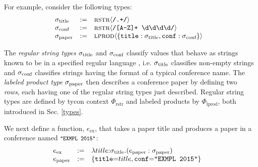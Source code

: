 \documentclass[pldi]{sigplanconf-pldi15}
\begin{document}
For example, consider the following types:
\[\begin{array}{lcl}
\sigma_\text{title} & := & {\textsc{rstr}}\langle\texttt{/.+/}\rangle\\
\sigma_\text{conf} & := & {\textsc{rstr}}\langle\texttt{/[A-Z]+ \textbackslash d\textbackslash d\textbackslash d\textbackslash d/}\rangle\\
\sigma_\text{paper} & := & {\textsc{lprod}}\langle\{\texttt{title} : \sigma_\text{title}, \texttt{conf} : \sigma_\text{conf}\}\rangle\end{array}\]

The \emph{regular string types} $\sigma_\text{title}$ and $\sigma_\text{conf}$ classify values that behave as strings known to be in a specified regular language \cite{sanitation-psp14}, i.e. $\sigma_\text{title}$ classifies {non-empty strings} and $\sigma_\text{conf}$ classifies strings having the format of a typical conference name. The \emph{labeled product type} $\sigma_\text{paper}$ then describes a conference paper by defining two \emph{rows}, each having one of the regular string types just described. Regular string types are defined by  tycon context $\Phi_\text{rstr}$ and labeled products by $\Phi_\text{lprod}$, both introduced in Sec. \ref{types}.%

We next define a function, $e_\text{ex}$, that takes a paper title and produces a paper in a conference named $\small\concstr{EXMPL 2015}$: %
\[\hspace{-5px}\begin{array}{lcl}
e_\text{ex} & := & \elam{\stx{title}}{title}{(e_\text{paper} : \stx{paper})}\\
e_\text{paper} & := & \{\conclbl{title}{=}title, \conclbl{conf}{=}\texttt{"EXMPL 2015"}\}
\end{array}\]
\end{document}
